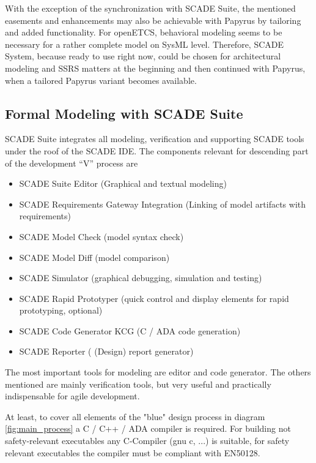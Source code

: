 With the exception of the synchronization with SCADE Suite, the mentioned easements and enhancements may also be achievable with Papyrus by tailoring and added functionality.
For openETCS, behavioral modeling seems to be necessary for a rather complete model on SysML level. 
Therefore, SCADE System, because ready to use right now, could be chosen for architectural modeling and SSRS matters at the beginning and then continued with Papyrus, when a tailored Papyrus variant becomes available.  

\subsection{Formal Modeling with SCADE Suite}
\label{sec:FormalModellingwithSCADESuite}

SCADE Suite integrates all modeling, verification and supporting SCADE tools under the roof of the SCADE IDE. The components relevant for descending part of the development "`V"' process are

\begin{itemize}
	\item SCADE Suite Editor (Graphical and textual modeling)
	\item SCADE Requirements Gateway Integration (Linking of model artifacts with requirements)
	\item SCADE Model Check (model syntax check)
	\item SCADE Model Diff (model comparison)
	\item SCADE Simulator (graphical debugging, simulation and testing) 
	\item SCADE Rapid Prototyper (quick control and display elements for rapid prototyping, optional)
	\item SCADE Code Generator KCG (C / ADA code generation)
	\item SCADE Reporter ( (Design) report generator)
\end{itemize}

The most important tools for modeling are editor and code generator. The others mentioned are mainly verification tools, but very useful and practically indispensable for agile development.

At least, to cover all elements of the "blue" design process in diagram \ref{fig:main_process} a C / C++ / ADA compiler is required. 
For building not safety-relevant executables any C-Compiler (gnu c, ...) is suitable, for safety relevant executables the compiler must be compliant with EN50128.   

